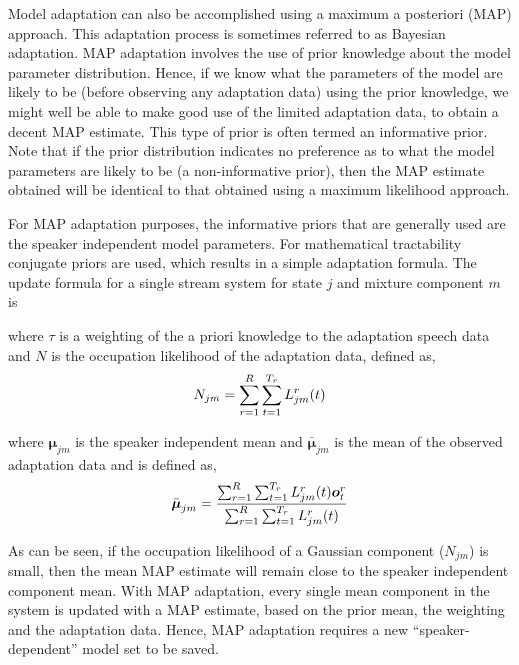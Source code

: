 
Model adaptation can also be accomplished using a maximum a
posteriori (MAP) approach. 
This adaptation process is sometimes
referred to as Bayesian adaptation. MAP adaptation involves the use 
of prior knowledge about the model parameter distribution.
Hence, if we know what the parameters of the model are
likely to be (before observing any adaptation data) using the prior
knowledge, we might well be able to make good use of the limited
adaptation data, to obtain a decent MAP estimate. This type of prior
is often termed an informative prior.
Note that if the prior
distribution indicates no preference as to what the model parameters
are likely to be (a non-informative prior), then the MAP estimate
obtained will be identical to that obtained using a maximum likelihood
approach.

For MAP adaptation purposes, the informative priors that are generally
used are the speaker independent model parameters. For mathematical
tractability conjugate priors are used, which results in a simple
adaptation formula. The update formula for a 
single stream system for state $j$ and mixture component $m$ is


where $\tau$ is a weighting of the a priori knowledge to the
adaptation speech data and $N$ is the occupation likelihood of the
adaptation data, defined as,
\[
   N_{jm} = \sum_{r=1}^R \sum_{t=1}^{T_r} L^r_{jm}(t)
\]

where $\bm{\mu}_{jm}$ is the speaker independent mean 
and $\bar{\bm{\mu}}_{jm}$ is the mean of the observed adaptation
data and is defined as,
\[
   \bar{{\mbox{\boldmath $\mu$}}}_{jm} = \frac{
                \sum_{r=1}^R \sum_{t=1}^{T_r} L^r_{jm}(t){\mbox{\boldmath $o$}}^r_{t}}{\sum_{r=1}^R \sum_{t=1}^{T_r} L^r_{jm}(t)}
\]

As can be seen, if the occupation likelihood
of a Gaussian component ($N_{jm}$) is small, then the
mean MAP estimate will remain close to the speaker
independent component mean. 
With MAP adaptation, every single mean
component in the system is updated with a MAP estimate, based on the
prior mean, the weighting and the adaptation data. Hence, MAP
adaptation requires a new ``speaker-dependent'' model set to be saved.

